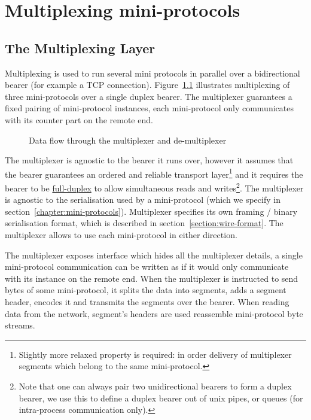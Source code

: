 \chapter{Multiplexing mini-protocols}
\label{chapter:multiplexer}

\section{The Multiplexing Layer}
\label{multiplexing-section}
Multiplexing is used to run several mini protocols in parallel over
a bidirectional bearer (for example a TCP connection).
Figure~\ref{mux-diagram} illustrates multiplexing of three mini-protocols over
a single duplex bearer.  The multiplexer guarantees a fixed pairing of
mini-protocol instances, each mini-protocol only communicates with its counter
part on the remote end.

\begin{figure}[ht]
\begin{center}
\end{center}
\caption{Data flow through the multiplexer and de-multiplexer}
\label{mux-diagram}
\end{figure}


The multiplexer is agnostic to the bearer it runs over, however it assumes that
the bearer guarantees an ordered and reliable transport layer\footnote{Slightly
more relaxed property is required: in order delivery of multiplexer segments
which belong to the same mini-protocol.} and it requires the bearer to be
\href{https://www.wikiwand.com/en/Duplex_(telecommunications)\#/Full-duplex}{full-duplex}
to allow simultaneous reads and writes\footnote{Note that one can always pair
two unidirectional bearers to form a duplex bearer, we use this to define
a duplex bearer out of unix pipes, or queues (for intra-process communication
only).}.  The multiplexer is agnostic to the serialisation used by
a mini-protocol (which we specify in section~\ref{chapter:mini-protocols}).
Multiplexer specifies its own framing / binary serialisation format, which is
described in section~\ref{section:wire-format}.  The multiplexer allows to use
each mini-protocol in either direction.

The multiplexer exposes interface which hides all the multiplexer details,
a single mini-protocol communication can be written as if it would only
communicate with its instance on the remote end.  When the multiplexer is
instructed to send bytes of some mini-protocol, it splits the data into
segments, adds a segment header, encodes it and transmits the segments over the
bearer.  When reading data from the network, segment's headers are used
reassemble mini-protocol byte streams.

